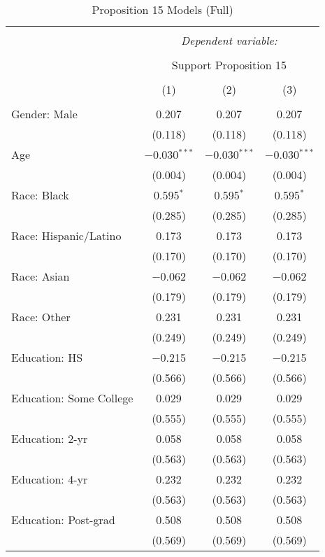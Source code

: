 
\begin{table}[!htbp] \centering 
  \caption{Proposition 15 Models (Full)} 
  \label{tab:reg_prop15_long} 
\footnotesize 
\begin{tabular}{@{\extracolsep{5pt}}lccc} 
\\[-1.8ex]\hline 
\hline \\[-1.8ex] 
 & \multicolumn{3}{c}{\textit{Dependent variable:}} \\ 
\cline{2-4} 
\\[-1.8ex] & \multicolumn{3}{c}{Support Proposition 15} \\ 
\\[-1.8ex] & (1) & (2) & (3)\\ 
\hline \\[-1.8ex] 
 Gender: Male & 0.207 & 0.207 & 0.207 \\ 
  & (0.118) & (0.118) & (0.118) \\ 
  Age & $-$0.030$^{***}$ & $-$0.030$^{***}$ & $-$0.030$^{***}$ \\ 
  & (0.004) & (0.004) & (0.004) \\ 
  Race: Black & 0.595$^{*}$ & 0.595$^{*}$ & 0.595$^{*}$ \\ 
  & (0.285) & (0.285) & (0.285) \\ 
  Race: Hispanic/Latino & 0.173 & 0.173 & 0.173 \\ 
  & (0.170) & (0.170) & (0.170) \\ 
  Race: Asian & $-$0.062 & $-$0.062 & $-$0.062 \\ 
  & (0.179) & (0.179) & (0.179) \\ 
  Race: Other & 0.231 & 0.231 & 0.231 \\ 
  & (0.249) & (0.249) & (0.249) \\ 
  Education: HS & $-$0.215 & $-$0.215 & $-$0.215 \\ 
  & (0.566) & (0.566) & (0.566) \\ 
  Education: Some College & 0.029 & 0.029 & 0.029 \\ 
  & (0.555) & (0.555) & (0.555) \\ 
  Education: 2-yr & 0.058 & 0.058 & 0.058 \\ 
  & (0.563) & (0.563) & (0.563) \\ 
  Education: 4-yr & 0.232 & 0.232 & 0.232 \\ 
  & (0.563) & (0.563) & (0.563) \\ 
  Education: Post-grad & 0.508 & 0.508 & 0.508 \\ 
  & (0.569) & (0.569) & (0.569) \\ 

\end{tabular}
\end{table}
